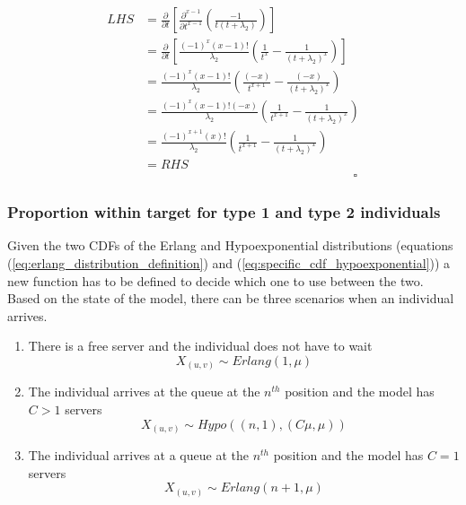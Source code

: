 \begin{itemize}
\begin{enumerate}
        \begin{equation*}
            \begin{split}
                LHS &= \frac{\partial}{\partial t}
                \left[ \frac{\partial^{x-1}}{\partial t ^ {x-1}}
                \left( \frac{-1}{t (t + \lambda_2)} \right) \right] \\
                &= \frac{\partial}{\partial t} \left[
                    \frac{(-1)^x (x-1)!}{\lambda_2} \left(
                        \frac{1}{t^x} - \frac{1}{(t + \lambda_2)^x}
                    \right)
                \right] \\
                &= \frac{(-1)^x (x-1)!}{\lambda_2} \left(
                    \frac{(-x)}{t^{x+1}} - \frac{(-x)}{(t + \lambda_2)^x}
                \right) \\
                &= \frac{(-1)^x (x-1)! (-x)}{\lambda_2} \left(
                    \frac{1}{t^{x+1}} - \frac{1}{(t + \lambda_2)^x}
                \right) \\
                &= \frac{(-1)^{x+1} (x)!}{\lambda_2} \left(
                    \frac{1}{t^{x+1}} - \frac{1}{(t + \lambda_2)^x}
                \right) \\
                & = RHS \\
                & \hspace{7cm} \square
            \end{split}
        \end{equation*}
    \end{enumerate}
\end{itemize}

\subsubsection{Proportion within target for type 1 and type 2 individuals}

Given the two CDFs of the Erlang and Hypoexponential distributions (equations
(\ref{eq:erlang_distribution_definition}) and
(\ref{eq:specific_cdf_hypoexponential})) a new function has to be defined to
decide which one to use between the two.
Based on the state of the model, there can be three scenarios when an individual
arrives.
\begin{enumerate}
    \item There is a free server and the individual does not have to wait
    \begin{equation*}
        X_{(u,v)} \sim Erlang(1, \mu)
    \end{equation*}
    \item The individual arrives at the queue at the \(n^{th}\) position and the
    model has \(C > 1\) servers
    \begin{equation*}
        X_{(u,v)} \sim Hypo((n, 1), (C \mu, \mu))
    \end{equation*}
    \item The individual arrives at a queue at the \(n^{th}\) position and the
    model has \(C = 1\) servers
    \begin{equation*}
        X_{(u,v)} \sim Erlang(n + 1, \mu)
    \end{equation*}
\end{enumerate}

